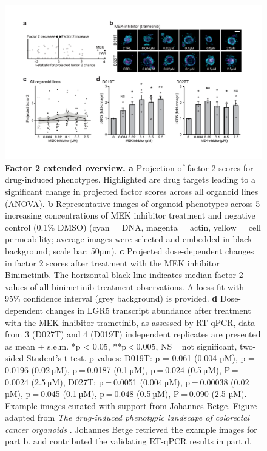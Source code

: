\begin{flushleft}
\begin{figure}[h!]
\centering
\includegraphics[width=\textwidth,
                height=\textheight,
                keepaspectratio]{figures/promise/pdf/fig_5_3.pdf}
\caption[Factor 2 extended overview]{\textbf{Factor 2 extended overview. a} Projection of factor 2 scores for drug-induced phenotypes. Highlighted are drug targets leading to a significant change in projected factor scores across all organoid lines (ANOVA). \textbf{b} Representative images of organoid phenotypes across 5 increasing concentrations of MEK inhibitor treatment and negative control (0.1\% DMSO) (cyan = DNA, magenta = actin, yellow = cell permeability; average images were selected and embedded in black background; scale bar: 50µm). \textbf{c} Projected dose-dependent changes in factor 2 scores after treatment with the MEK inhibitor Binimetinib. The horizontal black line indicates median factor 2 values of all binimetinib treatment observations. A loess fit with 95\% confidence interval (grey background) is provided. \textbf{d} Dose-dependent changes in LGR5 transcript abundance after treatment with the MEK inhibitor trametinib, as assessed by RT-qPCR, data from 3 (D027T) and 4 (D019T) independent replicates are presented as mean + s.e.m. *p < 0.05, **p < 0.005, NS = not significant, two-sided Student’s t test. p values: D019T: p = 0.061 (0.004 µM), p = 0.0196 (0.02 µM), p = 0.0187 (0.1 µM), p = 0.024 (0.5 µM), P = 0.0024 (2.5 µM), D027T: p = 0.0051 (0.004 µM), p = 0.00038 (0.02 µM), p = 0.045 (0.1 µM), p = 0.048 (0.5 µM), P = 0.090 (2.5 µM). Example images curated with support from Johannes Betge. Figure adapted from \textit{The drug-induced phenotypic landscape of colorectal cancer organoids} \parencite{betgeDruginducedPhenotypicLandscape2022}. Johannes Betge retrieved the example images for part b. and contributed the validating RT-qPCR results in part d.}
\label{fig_253}
\end{figure}
\bigbreak


\end{flushleft}
